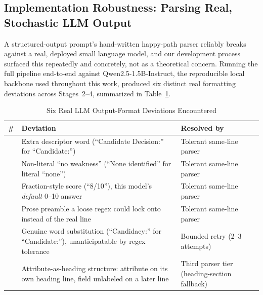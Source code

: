\documentclass[preprint,12pt,authoryear]{elsarticle}
\renewcommand{\_}{\textunderscore\allowbreak{}}
\begin{document}
\subsection{Implementation Robustness: Parsing Real, Stochastic LLM Output}
\label{sec:method-robustness}

A structured-output prompt's hand-written happy-path parser reliably breaks against a real, deployed small language model, and our development process surfaced this repeatedly and concretely, not as a theoretical concern. Running the full pipeline end-to-end against Qwen2.5-1.5B-Instruct, the reproducible local backbone used throughout this work, produced six distinct real formatting deviations across Stages~2--4, summarized in Table~\ref{tab:deviations}.

\begin{table}[!htbp]
\caption{Six Real LLM Output-Format Deviations Encountered\label{tab:deviations}}
\centering
\footnotesize
\setlength{\tabcolsep}{3pt}
\begin{tabular}{@{}
  >{\centering\arraybackslash}p{0.15in}
  >{\raggedright\arraybackslash}p{1.55in}
  >{\raggedright\arraybackslash}p{1.65in}
@{}}
\toprule
\# & Deviation & Resolved by \\
\midrule
1 & Extra descriptor word (``Candidate Decision:'' for ``Candidate:'') & Tolerant same-line parser \\
2 & Non-literal ``no weakness'' (``None identified'' for literal ``none'') & Tolerant same-line parser \\
3 & Fraction-style score (``8/10''), this model's \emph{default} 0--10 answer & Tolerant same-line parser \\
4 & Prose preamble a loose regex could lock onto instead of the real line & Tolerant same-line parser \\
5 & Genuine word substitution (``Candidacy:'' for ``Candidate:''), unanticipatable by regex tolerance & Bounded retry (2--3 attempts) \\
6 & Attribute-as-heading structure: attribute on its own heading line, field unlabeled on a later line & Third parser tier (heading-section fallback) \\
\bottomrule
\end{tabular}
\end{table}
\FloatBarrier
\end{document}
